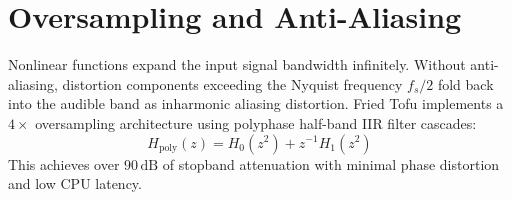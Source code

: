 \documentclass[11pt,a4paper]{article}
\begin{document}
\section{Oversampling and Anti-Aliasing}
Nonlinear functions expand the input signal bandwidth infinitely. Without anti-aliasing, distortion components exceeding the Nyquist frequency $f_s / 2$ fold back into the audible band as inharmonic aliasing distortion.
Fried Tofu implements a $4\times$ oversampling architecture using polyphase half-band IIR filter cascades:
\begin{equation}
    H_{\text{poly}}(z) = H_0(z^2) + z^{-1} H_1(z^2)
\end{equation}
This achieves over $90\,\text{dB}$ of stopband attenuation with minimal phase distortion and low CPU latency.
\end{document}
